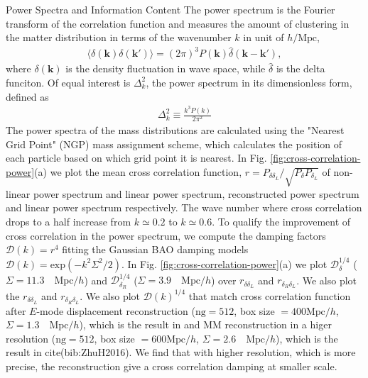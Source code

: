 \begin{section}{Power Spectra and Information Content}
  \label{sec:fisherinfo}
    The power spectrum is the Fourier transform of the correlation function and measures
 the amount of clustering in the matter distribution in terms of the wavenumber
 $k$ in unit of $h/\mathrm{Mpc}$,
\begin{align}
    \langle \delta \left( \bm{k} \right) \delta \left( \bm{k'}\right) \rangle =
\left( 2\pi \right) ^3 P \left( \bm{k} \right) \hat{\delta} \left( \bm{k}-\bm{k'} \right),
\end{align}
where $\delta \left( \bm{k} \right)$ is the density fluctuation in wave space, while 
$\hat{\delta}$ is the delta funciton. Of equal interest is $\Delta ^2_k$, the power 
spectrum in its dimensionless form, defined as
\begin{align}
    \Delta ^2_k \equiv \frac{k^3 P \left( k \right)}{2\pi ^2}
\end{align}
    The power spectra of the mass distributions are calculated using the "Nearest Grid Point" 
(NGP) mass assignment scheme, which calculates the position of each particle based on which 
grid point it is nearest. In Fig. \ref{fig:cross-correlation-power}(a) we plot the mean cross correlation 
function, $r=P_{\delta \delta_L}/\sqrt{P_\delta P_{\delta_L}}$ of non-linear power spectrum and 
linear power spectrum, reconstructed power spectrum and 
linear power spectrum respectively. The wave number where cross correlation drops to a half increase 
from $k\simeq 0.2$ to $k \simeq 0.6$. To qualify the improvement of cross correlation in the 
power spectrum, we compute the damping factors $\mathcal{D}(k)=r^4$ fitting the Gaussian BAO damping models 
$\mathcal{D}(k)=\mathrm{exp}(-k^2 \Sigma^2/2)$. In Fig. \ref{fig:cross-correlation-power}(a) 
we plot $\mathcal{D}_\delta^{1/4}$ ($\Sigma = 11.3 \quad \mathrm{Mpc}/h$) and $\mathcal{D}_{\delta_R}^{1/4}$ 
($\Sigma = 3.9 \quad \mathrm{Mpc}/h$) over $r_{\delta\delta_L}$ and $r_{\delta_R\delta_L}$. 
We also plot the $r_{\delta\delta_L}$ and $r_{\delta_R\delta_L}$. We also plot $\mathcal{D}(k)^{1/4}$ 
that match cross correlation function after $E$-mode displacement 
reconstruction ($\mathrm{ng}=512$, box size $=400 \mathrm{Mpc}/h$, $\Sigma = 1.3 \quad \mathrm{Mpc}/h$), 
which is the result in \cite{bib:Yu2016} and 
MM reconstruction in a higer resolution ($\mathrm{ng}=512$, box size $=600 \mathrm{Mpc}/h$, $\Sigma = 2.6 \quad \mathrm{Mpc}/h$), 
which is the result in cite(bib:ZhuH2016). We find that with higher resolution, which is more precise, 
the reconstruction give a cross correlation damping at smaller scale. 

\end{section}

